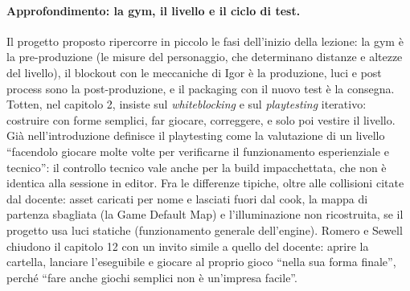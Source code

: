 \paragraph{Approfondimento: la gym, il livello e il ciclo di test.} Il progetto proposto
ripercorre in piccolo le fasi dell'inizio della lezione: la gym è la pre-produzione (le misure
del personaggio, che determinano distanze e altezze del livello), il blockout con le meccaniche
di Igor è la produzione, luci e post process sono la post-produzione, e il packaging con il
nuovo test è la consegna. Totten, nel capitolo 2, insiste sul \emph{whiteblocking} e sul
\emph{playtesting} iterativo: costruire con forme semplici, far giocare, correggere, e solo poi
vestire il livello. Già nell'introduzione definisce il playtesting come la valutazione di un
livello ``facendolo giocare molte volte per verificarne il funzionamento esperienziale e
tecnico'': il controllo tecnico vale anche per la build impacchettata, che non è identica alla
sessione in editor. Fra le
differenze tipiche, oltre alle collisioni citate dal docente: asset caricati per nome e lasciati
fuori dal cook, la mappa di partenza sbagliata (la Game Default Map) e l'illuminazione non
ricostruita, se il progetto usa luci statiche (funzionamento generale dell'engine). Romero e
Sewell chiudono il capitolo 12 con un invito simile a quello del docente: aprire la cartella,
lanciare l'eseguibile e giocare al proprio gioco ``nella sua forma finale'', perché ``fare anche
giochi semplici non è un'impresa facile''.


